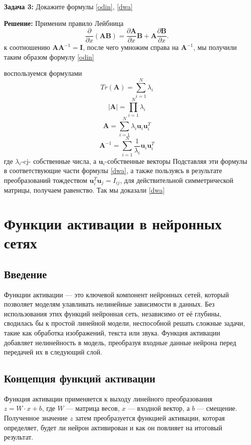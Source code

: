 \textbf{Задача 3:}
Докажите формулы \ref{odin}, \ref{dwa} \

\textbf{Решение:}
Применим правило Лейбница
\[
\frac{\partial}{\partial x} (\mathbf{AB})=\frac{\partial \mathbf{A}}{\partial x}
 \mathbf{B}+\mathbf{A}\frac{\partial \mathbf{B}}{\partial x}.
\]
к соотношению $\mathbf{AA}^{-1}=\mathbf{I}$, после чего умножим справа на $\mathbf{A}^{-1}$, мы получили таким образом формулу \ref{odin}

воспользуемся формулами 
\[
Tr(\mathbf{A})=\displaystyle \sum_{i=1}^{N} \lambda_i
\]
\[
|\mathbf{A}|=\displaystyle \prod_{i=1}^{N} \lambda_i
\]
\[
\mathbf{A}=\displaystyle \sum_{i=1}^{N} \lambda_i \mathbf{u}_i\mathbf{u}_i^{T}
\]
\[
\mathbf{A}^{-1}=\displaystyle \sum_{i=1}^{N} \frac{1}{\lambda_i} \mathbf{u}_i\mathbf{u}_i^{T}
\]
где $\lambda_i$-cj- собственные числа, а $\mathbf{u}_i$-собственные векторы
Подставляя эти формулы в соответствующие части формулы \ref{dwa}, а также пользуясь в результате преобразований тождеством $\mathbf{u}_i^{T}\mathbf{u}_j=I_{ij}$, для действительной симметрической матрицы, получаем равенство. Так мы доказали \ref{dwa}


\section*{Функции активации в нейронных сетях}

\subsection*{Введение}
Функции активации — это ключевой компонент нейронных сетей, который позволяет моделям улавливать нелинейные зависимости в данных. Без использования этих функций нейронная сеть, независимо от её глубины, сводилась бы к простой линейной модели, неспособной решать сложные задачи, такие как обработка изображений, текста или звука. Функция активации добавляет нелинейность в модель, преобразуя входные данные нейрона перед передачей их в следующий слой.

\subsection*{Концепция функций активации}
Функция активации применяется к выходу линейного преобразования $z = W \cdot x + b$, где $W$ — матрица весов, $x$ — входной вектор, а $b$ — смещение. Полученное значение $z$ затем преобразуется функцией активации, которая определяет, будет ли нейрон активирован и как он повлияет на итоговый результат.


